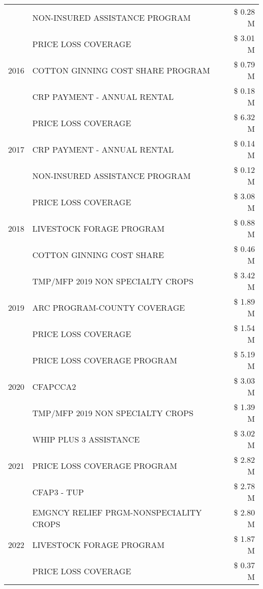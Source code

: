 \begin{tabular}{llr}
 & NON-INSURED ASSISTANCE PROGRAM & \$ 0.28 M \\
\cline{1-3}
\multirow[t]{3}{*}{2016} & PRICE LOSS COVERAGE & \$ 3.01 M \\
 & COTTON GINNING COST SHARE PROGRAM & \$ 0.79 M \\
 & CRP PAYMENT - ANNUAL RENTAL & \$ 0.18 M \\
\cline{1-3}
\multirow[t]{3}{*}{2017} & PRICE LOSS COVERAGE & \$ 6.32 M \\
 & CRP PAYMENT - ANNUAL RENTAL & \$ 0.14 M \\
 & NON-INSURED ASSISTANCE PROGRAM & \$ 0.12 M \\
\cline{1-3}
\multirow[t]{3}{*}{2018} & PRICE LOSS COVERAGE & \$ 3.08 M \\
 & LIVESTOCK FORAGE PROGRAM & \$ 0.88 M \\
 & COTTON GINNING COST SHARE & \$ 0.46 M \\
\cline{1-3}
\multirow[t]{3}{*}{2019} & TMP/MFP 2019 NON SPECIALTY CROPS & \$ 3.42 M \\
 & ARC PROGRAM-COUNTY COVERAGE & \$ 1.89 M \\
 & PRICE LOSS COVERAGE & \$ 1.54 M \\
\cline{1-3}
\multirow[t]{3}{*}{2020} & PRICE LOSS COVERAGE PROGRAM & \$ 5.19 M \\
 & CFAPCCA2 & \$ 3.03 M \\
 & TMP/MFP 2019 NON SPECIALTY CROPS & \$ 1.39 M \\
\cline{1-3}
\multirow[t]{3}{*}{2021} & WHIP PLUS 3 ASSISTANCE & \$ 3.02 M \\
 & PRICE LOSS COVERAGE PROGRAM & \$ 2.82 M \\
 & CFAP3 - TUP & \$ 2.78 M \\
\cline{1-3}
\multirow[t]{3}{*}{2022} & EMGNCY RELIEF PRGM-NONSPECIALITY CROPS & \$ 2.80 M \\
 & LIVESTOCK FORAGE PROGRAM & \$ 1.87 M \\
 & PRICE LOSS COVERAGE & \$ 0.37 M \\
\cline{1-3}
\bottomrule
\end{tabular}
